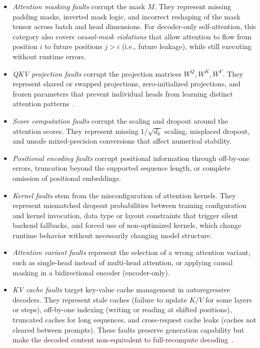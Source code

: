 \begin{itemize}

  \item \emph{Attention masking faults} corrupt the mask $M$. They represent missing padding masks, inverted mask logic, and incorrect reshaping of the mask tensor across batch and head dimensions. For decoder-only self-attention, this category also covers \emph{causal-mask violations} that allow attention to flow from position $i$ to future positions $j>i$ (i.e., future leakage), while still executing without runtime errors.

  \item \emph{QKV projection faults} corrupt the projection matrices $W^Q, W^K, W^V$. They represent shared or swapped projections, zero-initialized projections, and frozen parameters that prevent individual heads from learning distinct attention patterns~\citep{michel2019sixteen,voita2019analyzing}.

  \item \emph{Score computation faults} corrupt the scaling and dropout around the attention scores. They represent missing $1/\sqrt{d_k}$ scaling, misplaced dropout, and unsafe mixed-precision conversions that affect numerical stability.

  \item \emph{Positional encoding faults} corrupt positional information through off-by-one errors, truncation beyond the supported sequence length, or complete omission of positional embeddings.

  \item \emph{Kernel faults} stem from the misconfiguration of attention kernels. They represent mismatched dropout probabilities between training configuration and kernel invocation, data type or layout constraints that trigger silent backend fallbacks, and forced use of non-optimized kernels, which change runtime behavior without necessarily changing model structure.

  \item \emph{Attention variant faults} represent the selection of a wrong attention variant, such as single-head instead of multi-head attention, or applying causal masking in a bidirectional encoder (encoder-only).

  \item \emph{KV cache faults} target key-value cache management in autoregressive decoders. They represent stale caches (failure to update $K/V$ for some layers or steps), off-by-one indexing (writing or reading at shifted positions), truncated caches for long sequences, and cross-request cache leaks (caches not cleared between prompts). These faults preserve generation capability but make the decoded content non-equivalent to full-recompute decoding~\citep{adnan2024keyformer}.
\end{itemize}

